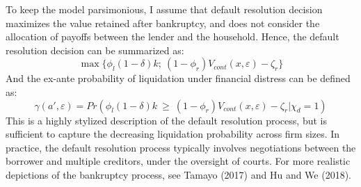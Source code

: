 \documentclass[12pt]{article}
\begin{document}
To keep the model parsimonious, I assume that default resolution decision maximizes the value retained after bankruptcy, and does not consider the allocation of payoffs between the lender and the household. Hence, the default resolution decision can be summarized as: 
\begin{equation} \label{eq:liquidation decision}
 \max \{ \phi_l (1-\delta) k; \ (1-\phi_r) V_{cont}(x,\varepsilon)- \zeta_r\}
\end{equation}
And the ex-ante probability of liquidation under financial distress can be defined as: 
\begin{equation} \label{eq:liquidation probability}
    \gamma(a', \varepsilon) = Pr(\phi_l (1-\delta) k \ \geq \ (1-\phi_r) V_{cont}(x,\varepsilon) - \zeta_r | \chi_d = 1)
\end{equation} 
This is a highly stylized description of the default resolution process, but is sufficient to capture the decreasing liquidation probability across firm sizes. In practice, the default resolution process typically involves negotiations between the borrower and multiple creditors, under the oversight of courts. For more realistic depictions of the bankruptcy process, see Tamayo (2017) and Hu and We (2018). 
\end{document}
